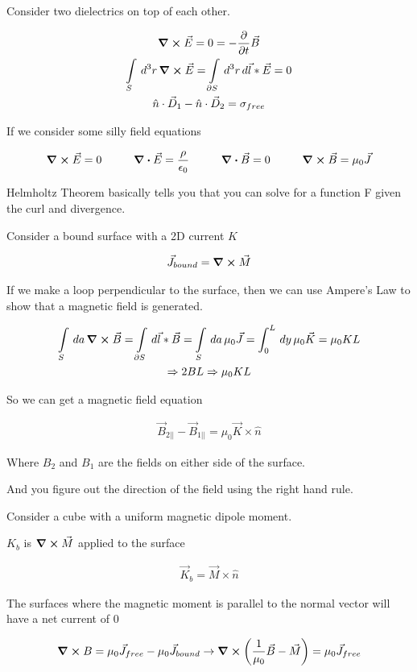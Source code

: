 \documentclass[fleqn]{report}
\newcommand{\hp}{\hspace{1cm}}
\newcommand{\del}{\partial}
\newcommand{\equations} [1] {
\begin{gather*}
#1
\end{gather*}
}
\begin{document}
Consider two dielectrics on top of each other. 

\equations{
    \curl \vec E = 0 = - \frac{\del}{\del t} \vec B
    \\
    \int\limits_{S} \, d^3 r \, 
    \curl \vec E 
    =
    \int\limits_{\del S} \, d^3 r \, 
    d \vec l * \vec E 
    =
    0
    \\
    \hat n \cdot \vec D_1
    -
    \hat n \cdot \vec D_2
    =
    \sigma_{free}
}

If we consider some silly field equations 
\equations{
    \curl \vec E = 0 
    \hp 
    \div \vec E = \frac{\rho}{\epsilon_0}
    \hp
    \div \vec B = 0 
    \hp 
    \curl \vec B = \mu_0 \vec J
}

Helmholtz Theorem basically tells you that you can solve for a function 
F given the curl and divergence. 

Consider a bound surface with a 2D current $K$ 

\equations{
    \vec J_{bound} 
    =
    \curl \vec M 
}

If we make a loop perpendicular to the surface, then we can use 
Ampere's Law to show that a magnetic field is generated. 

\equations{
    \int\limits_S \, da \, 
    \curl \vec B 
    =
    \int\limits_{\del S} \, 
    d \vec l * \vec B 
    =
    \int\limits_S \, da \, 
    \mu_0 \vec J
    =
    \int^L_0 \, dy \, 
    \mu_0 \vec K
    =
    \mu_0 K L 
    \\
    \Rightarrow 
    2BL \Rightarrow \mu_0 K L 
}

So we can get a magnetic field equation 

\equations{
    \vec B_{2 ||}
    -
    \vec B_{1 ||}
    =
    \mu_0 
    \vec K \times \hat n 
}

Where $B_2$ and $B_1$ are the fields on either side of the surface. 

And you figure out the direction of the field using the right hand rule. 

Consider a cube with a uniform magnetic dipole moment. 

$K_b$ is $\curl \vec M $ applied to the surface 

\equations{
    \vec K_b 
    =
    \vec M \times \hat n 
}

The surfaces where the magnetic moment is parallel to the normal vector 
will have a net current of $0$ 

\equations{
    \curl B 
    =
    \mu_0 \vec J_{free}
    -
    \mu_0 \vec J_{bound}
    \rightarrow 
    \curl 
    \left(
        \frac{1}{\mu_0}
        \vec B 
        -
        \vec M
    \right)
    =
    \mu_0 \vec J_{free}
}
\end{document}
